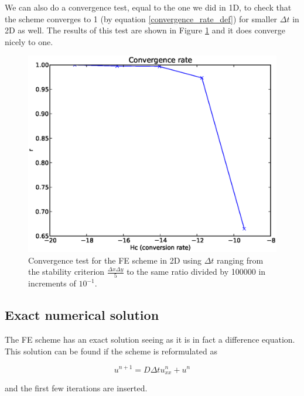 We can also do a convergence test, equal to the one we did in 1D, to check that the scheme converges to 1 (by equation \eqref{convergence_rate_def}) for smaller $\Delta t$ in 2D as well. 
The results of this test are shown in Figure \ref{convergence_test_FE_2d} and it does converge nicely to one.

\begin{figure}[H]
\centering
\includegraphics[scale=0.7]{../doc/results/experiment_29112013_1709/results/ConvergenceTest.eps}
\caption[Convergence test FE 2D]{Convergence test for the FE scheme in 2D using $\Delta t$ ranging from the stability criterion $\frac{\Delta x\Delta y}{5}$ to the same ratio divided by 100000 in increments of $10^{-1}$.}
\label{convergence_test_FE_2d}
\end{figure}

\subsection{Exact numerical solution}\label{exact_numerical_solution}

The FE scheme has an exact solution seeing as it is in fact a difference equation. 
This solution can be found if the scheme is reformulated as 

\begin{equation}
 u^{n+1} = D\Delta t u_{xx}^n + u^n
\end{equation}

and the first few iterations are inserted. 

